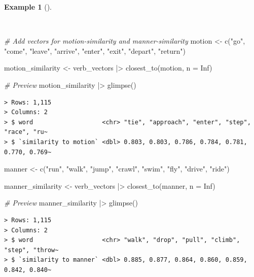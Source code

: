 \documentclass[
  letterpaper,
  DIV=11,
  numbers=noendperiod]{scrreport}
\newenvironment{Shaded}{\begin{snugshade}}{\end{snugshade}}
\newcommand{\AttributeTok}[1]{\textcolor[rgb]{0.00,0.00,0.00}{#1}}
\newcommand{\CommentTok}[1]{\textcolor[rgb]{0.00,0.00,0.00}{\textit{#1}}}
\newcommand{\ConstantTok}[1]{\textcolor[rgb]{0.00,0.00,0.00}{#1}}
\newcommand{\FunctionTok}[1]{\textcolor[rgb]{0.00,0.00,0.00}{#1}}
\newcommand{\NormalTok}[1]{\textcolor[rgb]{0.00,0.00,0.00}{#1}}
\newcommand{\OtherTok}[1]{\textcolor[rgb]{0.00,0.00,0.00}{#1}}
\newcommand{\SpecialCharTok}[1]{\textcolor[rgb]{0.00,0.00,0.00}{#1}}
\newcommand{\StringTok}[1]{\textcolor[rgb]{0.00,0.00,0.00}{#1}}
\theoremstyle{definition}
\newtheorem{example}{Example}[chapter]
\theoremstyle{remark}
\begin{document}
\begin{example}[]\protect\hypertarget{exm-eda-masc-vsm-word2vec-manner-motion}{}\label{exm-eda-masc-vsm-word2vec-manner-motion}

~

\begin{Shaded}
\begin{Highlighting}[]
\CommentTok{\# Add vectors for motion{-}similarity and manner{-}similarity}
\NormalTok{motion }\OtherTok{\textless{}{-}}
  \FunctionTok{c}\NormalTok{(}\StringTok{"go"}\NormalTok{, }\StringTok{"come"}\NormalTok{, }\StringTok{"leave"}\NormalTok{, }\StringTok{"arrive"}\NormalTok{, }\StringTok{"enter"}\NormalTok{, }\StringTok{"exit"}\NormalTok{, }\StringTok{"depart"}\NormalTok{, }\StringTok{"return"}\NormalTok{)}

\NormalTok{motion\_similarity }\OtherTok{\textless{}{-}}
\NormalTok{  verb\_vectors }\SpecialCharTok{|\textgreater{}} \FunctionTok{closest\_to}\NormalTok{(motion, }\AttributeTok{n =} \ConstantTok{Inf}\NormalTok{)}

\CommentTok{\# Preview}
\NormalTok{motion\_similarity }\SpecialCharTok{|\textgreater{}} \FunctionTok{glimpse}\NormalTok{()}
\end{Highlighting}
\end{Shaded}

\begin{verbatim}
> Rows: 1,115
> Columns: 2
> $ word                   <chr> "tie", "approach", "enter", "step", "race", "ru~
> $ `similarity to motion` <dbl> 0.803, 0.803, 0.786, 0.784, 0.781, 0.770, 0.769~
\end{verbatim}

\begin{Shaded}
\begin{Highlighting}[]
\NormalTok{manner }\OtherTok{\textless{}{-}}
  \FunctionTok{c}\NormalTok{(}\StringTok{"run"}\NormalTok{, }\StringTok{"walk"}\NormalTok{, }\StringTok{"jump"}\NormalTok{, }\StringTok{"crawl"}\NormalTok{, }\StringTok{"swim"}\NormalTok{, }\StringTok{"fly"}\NormalTok{, }\StringTok{"drive"}\NormalTok{, }\StringTok{"ride"}\NormalTok{)}

\NormalTok{manner\_similarity }\OtherTok{\textless{}{-}}
\NormalTok{  verb\_vectors }\SpecialCharTok{|\textgreater{}} \FunctionTok{closest\_to}\NormalTok{(manner, }\AttributeTok{n =} \ConstantTok{Inf}\NormalTok{)}

\CommentTok{\# Preview}
\NormalTok{manner\_similarity }\SpecialCharTok{|\textgreater{}} \FunctionTok{glimpse}\NormalTok{()}
\end{Highlighting}
\end{Shaded}

\begin{verbatim}
> Rows: 1,115
> Columns: 2
> $ word                   <chr> "walk", "drop", "pull", "climb", "step", "throw~
> $ `similarity to manner` <dbl> 0.885, 0.877, 0.864, 0.860, 0.859, 0.842, 0.840~
\end{verbatim}

\end{example}
\end{document}
